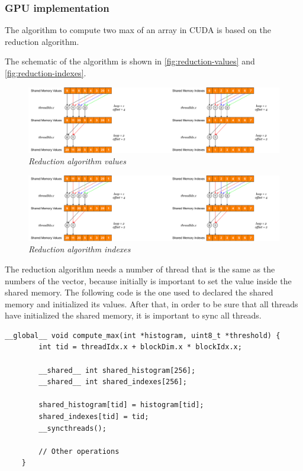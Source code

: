 \documentclass[paper=a4, fontsize=10pt]{scrartcl}	%
\begin{document}
				
	\subsubsection{GPU implementation}
	The algorithm to compute two max of an array in CUDA is based on the reduction algorithm.
				
	The schematic of the algorithm is shown in \autoref{fig:reduction-values} and \autoref{fig:reduction-indexes}.

	\begin{figure}[H]
		\centering
		\includegraphics[width=0.75\linewidth]{images/binarization/values.pdf}
		\caption{\textit{Reduction algorithm values}}
		\label{fig:reduction-values}
	\end{figure}

	\begin{figure}[H]
		\centering
		\includegraphics[width=0.75\linewidth]{images/binarization/indexes.pdf}
		\caption{\textit{Reduction algorithm indexes}}
		\label{fig:reduction-indexes}
	\end{figure}

	The reduction algorithm needs a number of thread that is the same as the numbers of the vector, because initially is important to set the value inside the shared memory. The following code is the one used to declared the shared memory and initialized its values. After that, in order to be sure that all threads have initialized the shared memory, it is important to sync all threads. 

	\begin{lstlisting}[style=CStyle]
	__global__ void compute_max(int *histogram, uint8_t *threshold) {
		int tid = threadIdx.x + blockDim.x * blockIdx.x;

		__shared__ int shared_histogram[256];
		__shared__ int shared_indexes[256];

		shared_histogram[tid] = histogram[tid];
		shared_indexes[tid] = tid;
		__syncthreads();

		// Other operations
	}
	\end{lstlisting}
\end{document}
